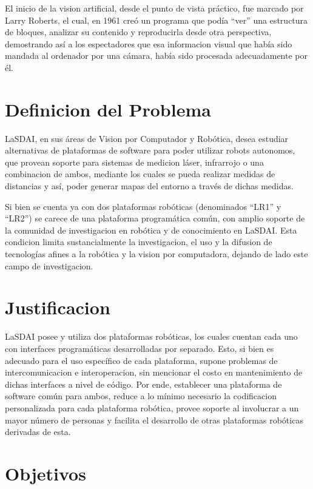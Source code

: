El inicio de la vision artificial, desde el punto de vista práctico, fue marcado por Larry Roberts, el cual, en 1961 creó un programa que podía ``ver'' una estructura de bloques, analizar su contenido y reproducirla desde otra perspectiva, demostrando así a los espectadores que esa informacion visual que había sido mandada al ordenador por una cámara, había sido procesada adecuadamente por él.\citep{bb68865}

\section{Definicion del Problema}

LaSDAI, en sus áreas de Vision por Computador y Robótica, desea estudiar alternativas de plataformas de software para poder utilizar robots autonomos, que provean soporte para sistemas de medicion láser, infrarrojo o una combinacion de ambos, mediante los cuales se pueda realizar medidas de distancias y así, poder generar mapas del entorno a través de dichas medidas.

Si bien se cuenta ya con dos plataformas robóticas (denominados ``LR1'' y ``LR2'') se carece de una plataforma programática común, con amplio soporte de la comunidad de investigacion en robótica y de conocimiento en LaSDAI\@. Esta condicion limita sustancialmente la investigacion, el uso y la difusion de tecnologías afines a la robótica y la vision por computadora, dejando de lado este campo de investigacion.

\section{Justificacion}

LaSDAI posee y utiliza dos plataformas robóticas, los cuales cuentan cada uno con interfaces programáticas desarrolladas por separado. Esto, si bien es adecuado para el uso específico de cada plataforma, supone problemas de intercomunicacion e interoperacion, sin mencionar el costo en mantenimiento de dichas interfaces a nivel de código. Por ende, establecer una plataforma de software común para ambos, reduce a lo mínimo necesario la codificacion personalizada para cada plataforma robótica, provee soporte al involucrar a un mayor número de personas y facilita el desarrollo de otras plataformas robóticas derivadas de esta.

\section{Objetivos}

